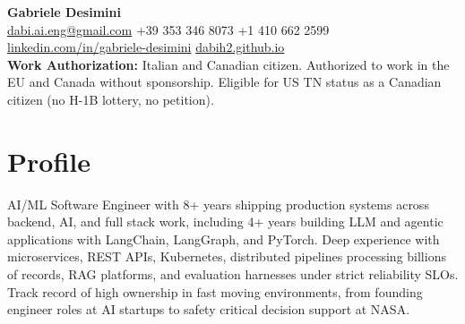 \documentclass[a4paper,10pt]{article}
\begin{document}
\begin{center}
    {\LARGE \textbf{Gabriele Desimini}} \\
    \vspace{4pt}
    \href{mailto:dabi.ai.eng@gmail.com}{dabi.ai.eng@gmail.com} \quad
    +39 353 346 8073 \quad +1 410 662 2599 \\
    \vspace{2pt}
    \href{https://linkedin.com/in/gabriele-desimini}{linkedin.com/in/gabriele-desimini} \quad
    \href{https://dabih2.github.io}{dabih2.github.io} \\
    \vspace{2pt}
    \small{\textbf{Work Authorization:} Italian and Canadian citizen. Authorized to work in the EU and Canada without sponsorship. Eligible for US TN status as a Canadian citizen (no H-1B lottery, no petition).}
\end{center}

\vspace{6pt}

\section*{Profile}
AI/ML Software Engineer with 8+ years shipping production systems across backend, AI, and full stack work, including 4+ years building LLM and agentic applications with LangChain, LangGraph, and PyTorch. Deep experience with microservices, REST APIs, Kubernetes, distributed pipelines processing billions of records, RAG platforms, and evaluation harnesses under strict reliability SLOs. Track record of high ownership in fast moving environments, from founding engineer roles at AI startups to safety critical decision support at NASA.

\end{document}
